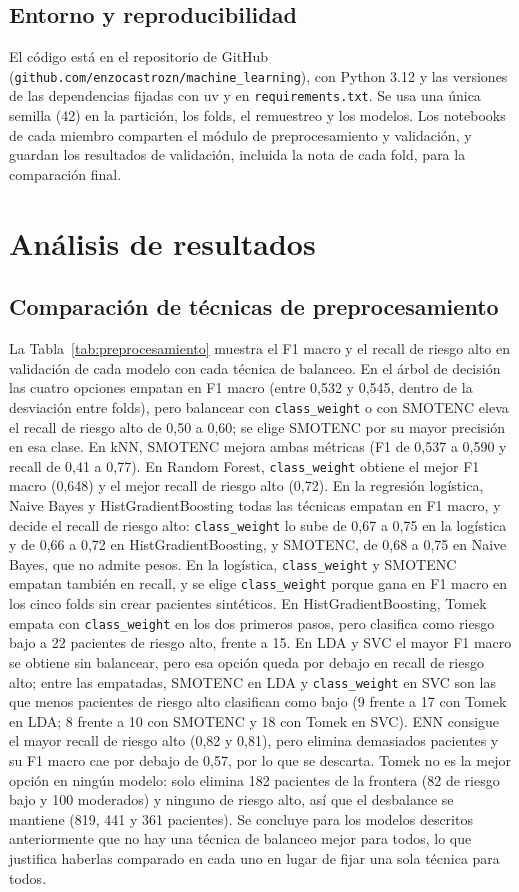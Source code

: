 \documentclass[journal,onecolumn]{IEEEtran}
\begin{document}
\subsection{Entorno y reproducibilidad}
El código está en el repositorio de GitHub (\texttt{github.com/enzocastrozn/machine\_learning}), con
Python 3.12 y las versiones de las dependencias fijadas con uv y en \texttt{requirements.txt}.
Se usa una única semilla (42) en la partición, los folds, el remuestreo y los modelos.
Los notebooks de cada miembro comparten el módulo de preprocesamiento y validación, y guardan los
resultados de validación, incluida la nota de cada fold, para la comparación final.

\section{Análisis de resultados}

\subsection{Comparación de técnicas de preprocesamiento}
La Tabla~\ref{tab:preprocesamiento} muestra el F1 macro y el recall de riesgo alto en validación de
cada modelo con cada técnica de balanceo.
En el árbol de decisión las cuatro opciones empatan en F1 macro (entre 0,532 y 0,545, dentro de la
desviación entre folds), pero balancear con \texttt{class\_weight} o con SMOTENC eleva el recall de
riesgo alto de 0,50 a 0,60; se elige SMOTENC por su mayor precisión en esa clase.
En kNN, SMOTENC mejora ambas métricas (F1 de 0,537 a 0,590 y recall de 0,41 a 0,77).
En Random Forest, \texttt{class\_weight} obtiene el mejor F1 macro (0,648) y el mejor recall de
riesgo alto (0,72).
En la regresión logística, Naive Bayes y HistGradientBoosting todas las técnicas empatan en F1 macro,
y decide el recall de riesgo alto: \texttt{class\_weight} lo sube de 0,67 a 0,75 en la logística y
de 0,66 a 0,72 en HistGradientBoosting, y SMOTENC, de 0,68 a 0,75 en Naive Bayes, que no admite
pesos.
En la logística, \texttt{class\_weight} y SMOTENC empatan también en recall, y se elige
\texttt{class\_weight} porque gana en F1 macro en los cinco folds sin crear pacientes sintéticos.
En HistGradientBoosting, Tomek empata con \texttt{class\_weight} en los dos primeros pasos, pero
clasifica como riesgo bajo a 22 pacientes de riesgo alto, frente a 15.
En LDA y SVC el mayor F1 macro se obtiene sin balancear, pero esa opción queda por debajo en recall de
riesgo alto; entre las empatadas, SMOTENC en LDA y \texttt{class\_weight} en SVC son las que menos
pacientes de riesgo alto clasifican como bajo (9 frente a 17 con Tomek en LDA; 8 frente a 10 con
SMOTENC y 18 con Tomek en SVC).
ENN consigue el mayor recall de riesgo alto (0,82 y 0,81), pero elimina demasiados pacientes y su F1
macro cae por debajo de 0,57, por lo que se descarta.
Tomek no es la mejor opción en ningún modelo: solo elimina 182 pacientes de la frontera (82 de
riesgo bajo y 100 moderados) y ninguno de riesgo alto, así que el desbalance se mantiene (819, 441 y
361 pacientes).
Se concluye para los modelos descritos anteriormente que no hay una técnica de balanceo mejor para todos,
lo que justifica haberlas comparado en cada uno en lugar de fijar una sola técnica para todos.
\end{document}
